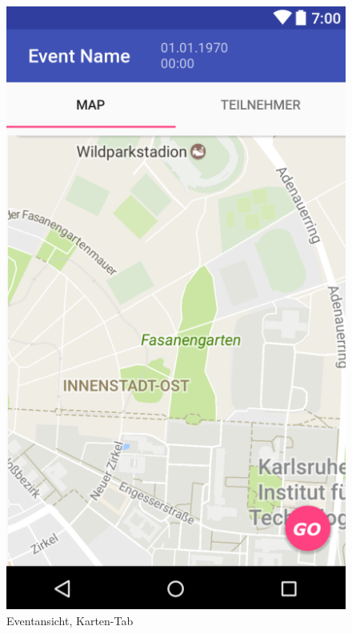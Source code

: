 \documentclass[parskip=full]{scrartcl}
\begin{document}
\begin{figure}[H]
  \vspace{1cm}
  \centering
  \begin{minipage}[b]{0.4\textwidth}
    \includegraphics[width=\textwidth]{GUI/AndroidStudio/event_info_navi.PNG}
	\caption{Eventansicht, Karten-Tab}\label{godetailansicht}
  \end{minipage}
  \hfill
  \begin{minipage}[b]{0.4\textwidth}

\end{minipage}
\end{figure}
\end{document}
